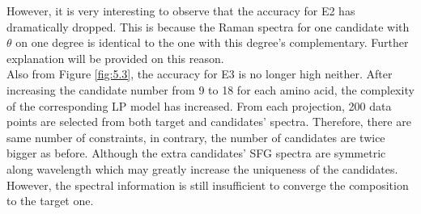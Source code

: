 However, it is very interesting to observe that the accuracy for E2 has dramatically dropped. This is because the Raman spectra for one candidate with $\theta$ on one degree is identical to the one with this degree's complementary. Further explanation  will be provided on this reason. \\

Also from Figure \ref{fig:5.3}, the accuracy for E3 is no longer high neither. After increasing the candidate number from 9 to 18 for each amino acid, the complexity of the corresponding LP model has increased. From each projection, 200 data points are selected from both target and candidates' spectra. Therefore, there are same number of constraints, in contrary, the number of candidates are twice bigger as before. Although the extra candidates' SFG spectra are symmetric along wavelength which may greatly increase the uniqueness of the candidates. However, the spectral information is still insufficient to converge the composition to the target one. \\


